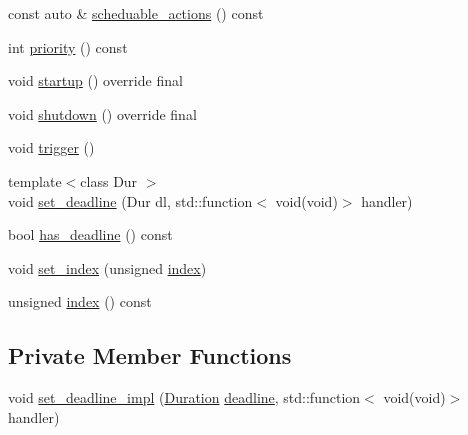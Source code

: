 \begin{DoxyCompactItemize}
\item 
const auto \& \hyperlink{classreactor_1_1Reaction_a0d7ebde1c7684c553925185299b4a872}{scheduable\+\_\+actions} () const
\item 
int \hyperlink{classreactor_1_1Reaction_a5fb22f21bbdf4f0303bb036d8afdf91e}{priority} () const
\item 
void \hyperlink{classreactor_1_1Reaction_a504359d36ac61662668787c9b650c314}{startup} () override final
\item 
void \hyperlink{classreactor_1_1Reaction_ae4011cf04c0d7158ffd1360fb00bcc29}{shutdown} () override final
\item 
void \hyperlink{classreactor_1_1Reaction_a33e0f5fff73c2908547dd1c65219ded6}{trigger} ()
\item 
{\footnotesize template$<$class Dur $>$ }\\void \hyperlink{classreactor_1_1Reaction_a2fc16f7109c4dddc894d54477fd96aed}{set\+\_\+deadline} (Dur dl, std\+::function$<$ void(void)$>$ handler)
\item 
bool \hyperlink{classreactor_1_1Reaction_a783267d5eeaba65163c5be768930ce05}{has\+\_\+deadline} () const
\item 
void \hyperlink{classreactor_1_1Reaction_a17c9cece9fe948cc5b85e8b9bd8f77c3}{set\+\_\+index} (unsigned \hyperlink{classreactor_1_1Reaction_a3bff1f3f5ad6094ba8d121c1657b3ef2}{index})
\item 
unsigned \hyperlink{classreactor_1_1Reaction_a3bff1f3f5ad6094ba8d121c1657b3ef2}{index} () const
\end{DoxyCompactItemize}
\subsection*{Private Member Functions}
\begin{DoxyCompactItemize}
\item 
void \hyperlink{classreactor_1_1Reaction_a8fee209cdb1d77185b0e9a992c044b71}{set\+\_\+deadline\+\_\+impl} (\hyperlink{namespacereactor_aa8375b807a80703545664096c5b5b779}{Duration} \hyperlink{classreactor_1_1Reaction_aa8704882695ff4a0b9ab7d866b2f79b1}{deadline}, std\+::function$<$ void(void)$>$ handler)
\end{DoxyCompactItemize}

